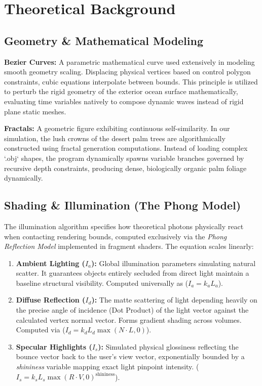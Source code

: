\documentclass[12pt, a4paper]{article}
\begin{document}
\newpage
\section{Theoretical Background}

\subsection{Geometry \& Mathematical Modeling}
\textbf{Bezier Curves:} A parametric mathematical curve used extensively in modeling smooth geometry scaling. Displacing physical vertices based on control polygon constraints, cubic equations interpolate between bounds. This principle is utilized to perturb the rigid geometry of the exterior ocean surface mathematically, evaluating time variables natively to compose dynamic waves instead of rigid plane static meshes.

\textbf{Fractals:} A geometric figure exhibiting continuous self-similarity. In our simulation, the lush crowns of the desert palm trees are algorithmically constructed using fractal generation computations. Instead of loading complex `.obj` shapes, the program dynamically spawns variable branches governed by recursive depth constraints, producing dense, biologically organic palm foliage dynamically.

\subsection{Shading \& Illumination (The Phong Model)}
The illumination algorithm specifies how theoretical photons physically react when contacting rendering bounds, computed exclusively via the \textit{Phong Reflection Model} implemented in fragment shaders.
The equation scales linearly:
\begin{enumerate}
    \item \textbf{Ambient Lighting ($I_a$):} Global illumination parameters simulating natural scatter. It guarantees objects entirely secluded from direct light maintain a baseline structural visibility. Computed universally as ($I_a = k_a L_a$).
    \item \textbf{Diffuse Reflection ($I_d$):} The matte scattering of light depending heavily on the precise angle of incidence (Dot Product) of the light vector against the calculated vertex normal vector. Forms gradient shading across volumes. Computed via ($I_d = k_d L_d \max(N \cdot L, 0)$).
    \item \textbf{Specular Highlights ($I_s$):} Simulated physical glossiness reflecting the bounce vector back to the user's view vector, exponentially bounded by a \textit{shininess} variable mapping exact light pinpoint intensity. ($I_s = k_s L_s \max(R \cdot V, 0)^{\text{shininess}}$).
\end{enumerate}
\end{document}
